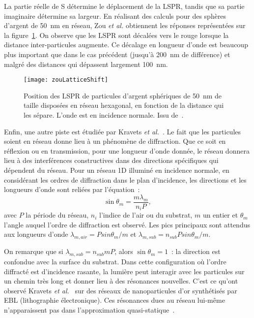 La partie réelle de S détermine le déplacement de la LSPR, tandis que sa partie imaginaire détermine sa largeur. En réalisant des calculs pour des sphères d'argent de 50~nm en réseau, Zou \textit{et al.} obtiennent les réponses représentées sur la figure~\ref{zouLatticeShift}. On observe que les LSPR sont décalées vers le rouge lorsque la distance inter-particules augmente. Ce décalage en longueur d'onde est beaucoup plus important que dans le cas précédent (jusqu'à 200~nm de différence) et malgré des distances qui dépassent largement 100~nm.\par
\begin{figure}[!htb]
	\centering
	\texttt{[image: zouLatticeShift]}
	\caption{Position des LSPR de particules d'argent sphériques de 50~nm de taille disposées en réseau hexagonal, en fonction de la distance qui les sépare. L'onde est en incidence normale. Issu de~\cite{zou2004narrow}.}
	\label{zouLatticeShift}
\end{figure}
Enfin, une autre piste est étudiée par Kravets \textit{et al.}~\cite{kravets2008extremely}. Le fait que les particules soient en réseau donne lieu à un phénomène de diffraction. Que ce soit en réflexion ou en transmission, pour une longueur d'onde donnée, le réseau donnera lieu à des interférences constructives dans des directions spécifiques qui dépendent du réseau. Pour un réseau 1D illuminé en incidence normale, en considérant les ordres de diffraction dans le plan d'incidence, les directions et les longueurs d'onde sont reliées par l'équation~:
\begin{equation}
\sin\theta_m=\dfrac{m\lambda_m}{n_iP},
\end{equation}
avec $P$ la période du réseau, $n_i$ l'indice de l'air ou du substrat, $m$ un entier et $\theta_m$ l'angle auquel l'ordre de diffraction est observé. Les pics principaux sont attendus aux longueurs d'onde $\lambda_{m,air} = P sin \theta_m / m$ et $\lambda_{m,sub} = n_{sub}P sin\theta_m / m$.\par 
On remarque que si $\lambda_{m,sub} = n_{sub}mP$, alors $\sin \theta_m = 1$~: la direction est confondue avec la surface du substrat. Dans cette configuration où l'ordre diffracté est d'incidence rasante, la lumière peut interagir avec les particules sur un chemin très long et donner lieu à des résonances nouvelles. C'est ce qu'ont observé Kravets \textit{et al.}~\cite{kravets2008extremely} sur des réseaux de nanoparticules d'or synthétisés par EBL (lithographie électronique). Ces résonances dues au réseau lui-même n'apparaissent pas dans l'approximation quasi-statique~\cite{yamaguchi74}.\par 
 
